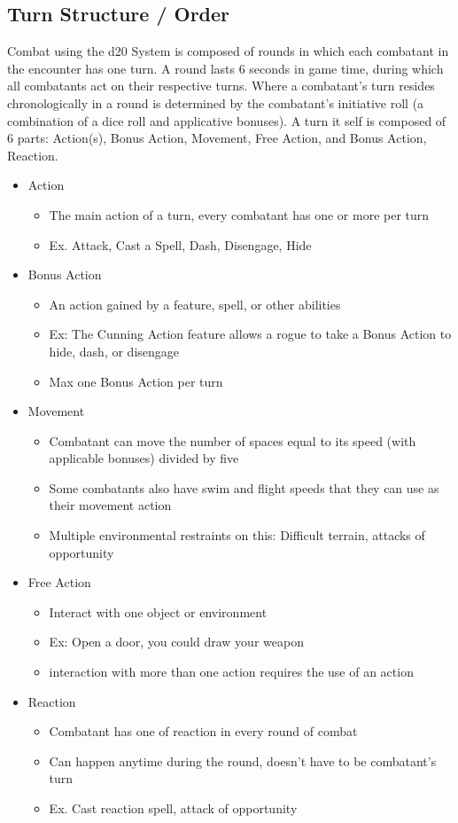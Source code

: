 \documentclass[12pt,a4paper]{report}
\begin{document}
	\subsection{Turn Structure / Order}
	Combat using the d20 System is composed of rounds in which each combatant in the encounter has one turn.  A round lasts 6 seconds in game time, during which all combatants act on their respective turns. Where a combatant's turn resides chronologically in a round is determined by the combatant's initiative roll (a combination of a dice roll and applicative bonuses). A turn it self is composed of 6 parts: Action(s), Bonus Action, Movement, Free Action, and Bonus Action, Reaction.
	\begin{itemize}
		\item Action
			\begin{itemize}
				\item The main action of a turn, every combatant has one or more per turn
				\item Ex. Attack, Cast a Spell, Dash, Disengage, Hide
			\end{itemize}
		\item Bonus Action
			\begin{itemize}
				\item An action gained by a feature, spell, or other abilities
				\item Ex: The Cunning Action feature allows a rogue to take a Bonus Action to hide, dash, or disengage
				\item Max one Bonus Action per turn
			\end{itemize}
		\item Movement
			\begin{itemize}
				\item Combatant can move the number of spaces equal to its speed (with applicable bonuses) divided by five
				\item Some combatants also have swim and flight speeds that they can use as their movement action
				\item Multiple environmental restraints on this: Difficult terrain, attacks of opportunity
			\end{itemize}
		\item Free Action
			\begin{itemize}
				\item Interact with one object or environment 
				\item Ex: Open a door, you could draw your weapon
				\item interaction with more than one action requires the use of an action
			\end{itemize}
		\item Reaction
			\begin{itemize}
				\item Combatant has one of reaction in every round of combat
				\item Can happen anytime during the round, doesn't have to be combatant's turn
				\item Ex. Cast reaction spell, attack of opportunity
			\end{itemize}
	\end{itemize}
\end{document}
